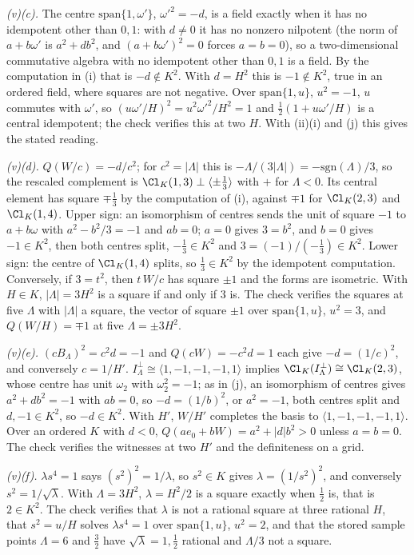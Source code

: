 \emph{(v)(c).} The centre $\mathrm{span}\{1, \omega'\}$, $\omega'^{2} = -d$, is a field exactly when it has no idempotent other than $0, 1$: with $d \neq 0$ it has no nonzero nilpotent (the norm of $a + b\omega'$ is $a^{2} + d b^{2}$, and $(a + b\omega')^{2} = 0$ forces $a = b = 0$), so a two-dimensional commutative algebra with no idempotent other than $0, 1$ is a field. By the computation in (i) that is $-d \notin K^{2}$. With $d = H^{2}$ this is $-1 \notin K^{2}$, true in an ordered field, where squares are not negative. Over $\mathrm{span}\{1, u\}$, $u^{2} = -1$, $u$ commutes with $\omega'$, so $(u\omega'/H)^{2} = u^{2}\omega'^{2}/H^{2} = 1$ and $\tfrac12(1 + u\omega'/H)$ is a central idempotent; the check verifies this at two $H$. With (ii)(i) and (j) this gives the stated reading.

\emph{(v)(d).} $Q(W/c) = -d/c^{2}$; for $c^{2} = |\Lambda|$ this is $-\Lambda/(3|\Lambda|) = -\mathrm{sgn}(\Lambda)/3$, so the rescaled complement is $\Cl_{K}(1,3) \perp \langle \pm\tfrac13\rangle$ with $+$ for $\Lambda < 0$. Its central element has square $\mp\tfrac13$ by the computation of (i), against $\mp 1$ for $\Cl_{K}(2,3)$ and $\Cl_{K}(1,4)$. Upper sign: an isomorphism of centres sends the unit of square $-1$ to $a + b\omega$ with $a^{2} - b^{2}/3 = -1$ and $ab = 0$; $a = 0$ gives $3 = b^{2}$, and $b = 0$ gives $-1 \in K^{2}$, then both centres split, $-\tfrac13 \in K^{2}$ and $3 = (-1)/(-\tfrac13) \in K^{2}$. Lower sign: the centre of $\Cl_{K}(1,4)$ splits, so $\tfrac13 \in K^{2}$ by the idempotent computation. Conversely, if $3 = t^{2}$, then $t\,W/c$ has square $\pm 1$ and the forms are isometric. With $H \in K$, $|\Lambda| = 3H^{2}$ is a square if and only if $3$ is. The check verifies the squares at five $\Lambda$ with $|\Lambda|$ a square, the vector of square $\pm1$ over $\mathrm{span}\{1, u\}$, $u^{2} = 3$, and $Q(W/H) = \mp 1$ at five $\Lambda = \pm 3H^{2}$.

\emph{(v)(e).} $(cB_{\Lambda})^{2} = c^{2}d = -1$ and $Q(cW) = -c^{2}d = 1$ each give $-d = (1/c)^{2}$, and conversely $c = 1/H'$. $I_{\Lambda}^{\perp} \cong \langle 1, -1, -1, -1, 1\rangle$ implies $\Cl_{K}(I_{\Lambda}^{\perp}) \cong \Cl_{K}(2,3)$, whose centre has unit $\omega_{2}$ with $\omega_{2}^{2} = -1$; as in (j), an isomorphism of centres gives $a^{2} + db^{2} = -1$ with $ab = 0$, so $-d = (1/b)^{2}$, or $a^{2} = -1$, both centres split and $d, -1 \in K^{2}$, so $-d \in K^{2}$. With $H'$, $W/H'$ completes the basis to $\langle 1, -1, -1, -1, 1\rangle$. Over an ordered $K$ with $d < 0$, $Q(ae_{0} + bW) = a^{2} + |d|b^{2} > 0$ unless $a = b = 0$. The check verifies the witnesses at two $H'$ and the definiteness on a grid.

\emph{(v)(f).} $\lambda s^{4} = 1$ says $(s^{2})^{2} = 1/\lambda$, so $s^{2} \in K$ gives $\lambda = (1/s^{2})^{2}$, and conversely $s^{2} = 1/\sqrt{\lambda}$. With $\Lambda = 3H^{2}$, $\lambda = H^{2}/2$ is a square exactly when $\tfrac12$ is, that is $2 \in K^{2}$. The check verifies that $\lambda$ is not a rational square at three rational $H$, that $s^{2} = u/H$ solves $\lambda s^{4} = 1$ over $\mathrm{span}\{1, u\}$, $u^{2} = 2$, and that the stored sample points $\Lambda = 6$ and $\tfrac32$ have $\sqrt{\lambda} = 1, \tfrac12$ rational and $\Lambda/3$ not a square.
